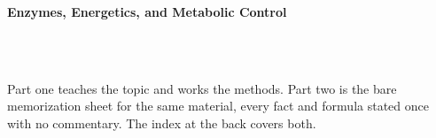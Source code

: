



\makeindex[title={Index of This Volume},columns=2,intoc]

\begin{titlepage}\thispagestyle{empty}
\vspace*{0.14\textheight}
\noindent{\color{tiercore}\rule{\textwidth}{5pt}}\\[3pt]
\noindent{\color{bioline}\rule{\textwidth}{1pt}}\\[26pt]
\\[12pt]
\noindent\begin{minipage}{\textwidth}\raggedright
{\sffamily\bfseries\fontsize{28}{32}\selectfont\color{bioink}%
 \hyphenchar{} Enzymes, Energetics, and Metabolic Control\par}\end{minipage}\\[16pt]
\noindent{\color{biogreen}\rule{\textwidth}{1.4pt}}\\[10pt]
\noindent\begin{minipage}{\textwidth}\raggedright
{\fontsize{10.5}{14}\selectfont\color{biogreen}%
Part one teaches the topic and works the methods. Part two is the bare memorization sheet for the
same material, every fact and formula stated once with no commentary. The index at the back covers both.\par}\end{minipage}
\vfill
\noindent{\color{bioline}\rule{\textwidth}{1pt}}\\[3pt]
\noindent{\color{tiercore}\rule{\textwidth}{5pt}}
\end{titlepage}
\tableofcontents
\clearpage
{}
\clearpage
\printindex

